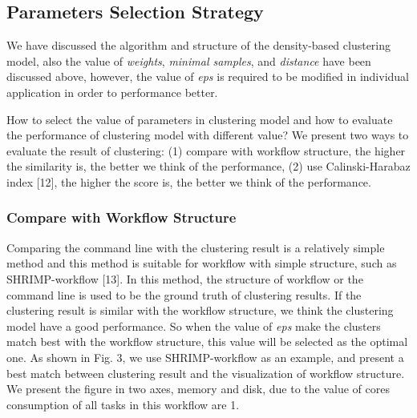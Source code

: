 \documentclass[conference]{IEEEtran}
\begin{document}
\subsection{Parameters Selection Strategy}
We have discussed the algorithm and structure of the density-based clustering model, also the value of \emph{weights}, \emph{minimal samples}, and \emph{distance} have been discussed above, however, the value of \emph{eps} is required to be modified in individual application in order to performance better.

How to select the value of parameters in clustering model and how to evaluate the performance of clustering model with different value? We present two ways to evaluate the result of clustering: (1) compare with workflow structure, the higher the similarity is, the better we think of the performance, (2) use Calinski-Harabaz index [12], the higher the score is, the better we think of the performance.

\subsubsection{Compare with Workflow Structure}
Comparing the command line with the clustering result is a relatively simple method and this method is suitable for workflow with simple structure, such as SHRIMP-workflow [13]. In this method, the structure of workflow or the command line is used to be the ground truth of clustering results. If the clustering result is similar with the workflow structure, we think the clustering model have a good performance. So when the value of \emph{eps} make the clusters match best with the workflow structure, this value will be selected as the optimal one. As shown in Fig. 3, we use SHRIMP-workflow as an example, and present a best match between clustering result and the visualization of workflow structure. We present the figure in two axes, memory and disk, due to the value of cores consumption of all tasks in this workflow are 1. 
\end{document}
